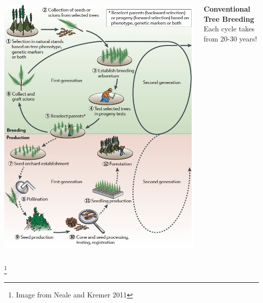 \documentclass[xcolor=dvipsnames]{beamer}
\newcommand\blfootnote[1]{%
	\begingroup
	\renewcommand\thefootnote{}\footnote{#1}%
	\addtocounter{footnote}{-1}%
	\endgroup
}
\begin{document}
\begin{frame}

\begin{columns}
	\begin{column}{0.6\textwidth}
		\centering 	\includegraphics[keepaspectratio, width  = \textwidth]{img/treeImprovement}
	\end{column}
	\begin{column}{0.4\textwidth}
		\textbf{Conventional Tree Breeding\\}
		\pause
		Each cycle takes from 20-30 years!
	\end{column}
\end{columns}
\blfootnote{Image from Neale and Kremer 2011}
\end{frame}
\end{document}
